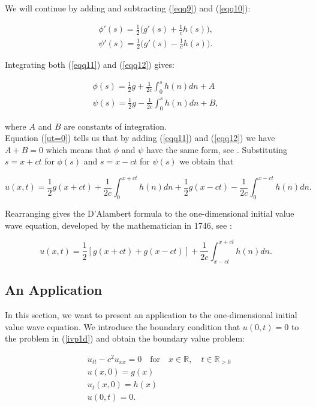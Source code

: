 \documentclass[a4paper, 12pt]{article}
\numberwithin{equation}{section}
\begin{document}
We will continue by adding and subtracting (\ref{eqq9}) and (\ref{eqq10}):

\begin{align} \label{eqq11}
    \phi'(s)=\frac{1}{2}\Big(g'(s)+\frac{1}{c}h(s)\Big),\\
    \label{eqq12}
    \psi'(s)=\frac{1}{2}\Big(g'(s)-\frac{1}{c}h(s)\Big).
\end{align}

Integrating both (\ref{eqq11}) and (\ref{eqq12}) gives:

\begin{equation}
    \begin{aligned}
    \phi(s)=\frac{1}{2}g+\frac{1}{2c}\int^s_0h(n)dn+A\\
    \psi(s)=\frac{1}{2}g-\frac{1}{2c}\int^s_0h(n)dn+B,
    \end{aligned}
\end{equation}

where $A$ and $B$ are constants of integration.
\\

Equation (\ref{ut=0}) tells us that by adding (\ref{eqq11}) and (\ref{eqq12}) we have $A+B=0$ which means that $\phi$ and $\psi$ have the
same form, see \cite{Str}. Substituting $s=x+ct$ for $\phi(s)$ and $s=x-ct$ for $\psi(s)$ we obtain that

\begin{equation}
    u(x,t)=\frac{1}{2}g(x+ct)+\frac{1}{2c}\int^{x+ct}_0h(n)dn+\frac{1}{2}g(x-ct)-\frac{1}{2c}\int^{x-ct}_0h(n)dn.
\end{equation}

Rearranging gives the D'Alambert formula to the one-dimensional initial value wave equation, developed by the mathematician in 1746, see \cite{Str}:

\begin{equation} \label{DAla}
    u(x,t)=\frac{1}{2}\left[g(x+ct)+g(x-ct)\right]+\frac{1}{2c}\int^{x+ct}_{x-ct}h(n)dn.
\end{equation}

\subsection{An Application} \label{anapplication}
In this section, we want to present an application to the one-dimensional initial value wave equation. We introduce the boundary condition that
$u(0,t)=0$ to the problem in (\ref{ivp1d}) and obtain the boundary value problem:

\begin{equation} \label{bvp1d}
    \begin{aligned}
    &u_{tt}-c^2u_{xx}=0 \quad \textrm {for} \quad x \in \mathbb{R}, \quad t \in \mathbb{R}_{>0}\\
    &u(x,0)=g(x)\\
    &u_t(x,0)=h(x)\\
    &u(0,t)=0.
    \end{aligned}
\end{equation}
\end{document}
